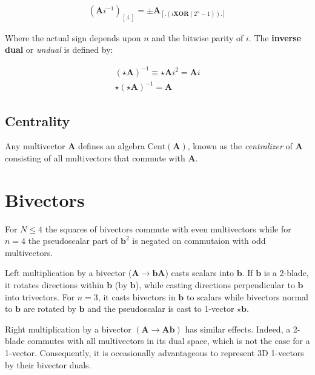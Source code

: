 \documentclass[a4paper]{book}
\numberwithin{equation}{chapter}
\begin{document}
\begin{align*}
    (\mathbf{A}i^{-1})_{[.i.]} = \pm \mathbf{A}_{[.(i \textbf{XOR}(2^n -1)).]}
\end{align*}

Where the actual sign depends upon $n$ and the bitwise parity of $i$.
The \textbf{inverse dual} or \emph{undual} is defined by:

\begin{align}
    (\star \mathbf{A})^{-1} \equiv \star \mathbf{A} i^2 = \mathbf{A}i \\
    \star(\star \mathbf{A})^{-1} = \mathbf{A}
\end{align}

    \subsection{Centrality}

Any multivector $\mathbf{A}$ defines an algebra
$\text{Cent}(\mathbf{A})$, known as the \emph{centralizer} of $\mathbf{A}$ 
consisting of all multivectors that commute with $\mathbf{A}$.

    \section{Bivectors}

For $N\le4$ the squares of bivectors commute with even multivectors while for $n=4$ 
the pseudoscalar part of $\mathbf{b}^2$ is negated on commutaion with odd multivectors.

\vspace{\baselineskip}

Left multiplication by a bivector ($\mathbf{A} \rightarrow \mathbf{bA}$) 
casts scalars into $\mathbf{b}$. If $\mathbf{b}$ is a 2-blade, it rotates 
directions within $\mathbf{b}$ (by $\mathbf{b}$), while casting directions perpendicular
to $\mathbf{b}$ into trivectors. For $n=3$, it casts bivectors in $\mathbf{b}$ 
to scalars while bivectors normal to $\mathbf{b}$ are rotated by $\mathbf{b}$ 
and the pseudoscalar is cast to 1-vector $\star \mathbf{b}$.

\vspace{\baselineskip}

Right multiplication by a bivector $(\mathbf{A} \rightarrow \mathbf{Ab})$ has similar effects. 
Indeed, a 2-blade commutes with all multivectors in its dual space, which is not the case 
for a 1-vector. Consequently, it is occasionally advantageous to represent 3D 1-vectors by their bivector duals.
\end{document}
